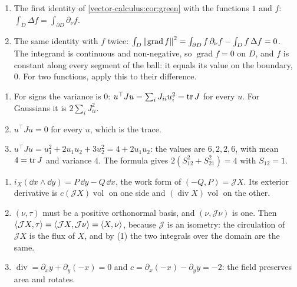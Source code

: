 \begin{enumerate}[nosep]
  \item The first identity of \cref{vector-calculus:cor:green} with
        the functions $1$ and $f$:
        $\int_D\Delta f = \int_{\partial D}\partial_\nu f$.
  \item The same identity with $f$ twice:
        $\int_D\left\|\operatorname{grad}f\right\|^2
        = \int_{\partial D}f\,\partial_\nu f - \int_Df\,\Delta f = 0$.
        The integrand is continuous and non-negative, so
        $\operatorname{grad}f = 0$ on $D$, and $f$ is constant along
        every segment of the ball: it equals its value on the
        boundary, $0$. For two functions, apply this to their
        difference.
\end{enumerate}

\begin{enumerate}[nosep]
  \item For signs the variance is $0$: $u^\top Ju = \sum_iJ_{ii}u_i^2
        = \operatorname{tr} J$ for every $u$. For Gaussians it is
        $2\sum_iJ_{ii}^2$.
  \item $u^\top Ju = 0$ for every $u$, which is the trace.
  \item $u^\top Ju = u_1^2 + 2u_1u_2 + 3u_2^2 = 4 + 2u_1u_2$: the
        values are $6, 2, 2, 6$, with mean $4 = \operatorname{tr} J$ and variance
        $4$. The formula gives $2(S_{12}^2 + S_{21}^2) = 4$ with
        $S_{12} = 1$.
\end{enumerate}

\begin{enumerate}[nosep]
  \item $i_X(\dd x\wedge\dd y) = P\,\dd y - Q\,\dd x$, the work form of
        $(-Q, P) = \mathcal JX$. Its exterior derivative is
        $c(\mathcal JX)\operatorname{vol}$ on one side and
        $(\operatorname{div}X)\operatorname{vol}$ on the other.
  \item $(\nu, \tau)$ must be a positive orthonormal basis, and
        $(\nu, \mathcal J\nu)$ is one. Then
        $\left\langle \mathcal JX, \tau \right\rangle
        = \left\langle \mathcal JX, \mathcal J\nu \right\rangle = \left\langle X, \nu \right\rangle$, because
        $\mathcal J$ is an isometry: the circulation of $\mathcal JX$
        is the flux of $X$, and by (1) the two integrals over the
        domain are the same.
  \item $\operatorname{div} = \partial_xy + \partial_y(-x) = 0$ and
        $c = \partial_x(-x) - \partial_yy = -2$: the field preserves
        area and rotates.
\end{enumerate}

